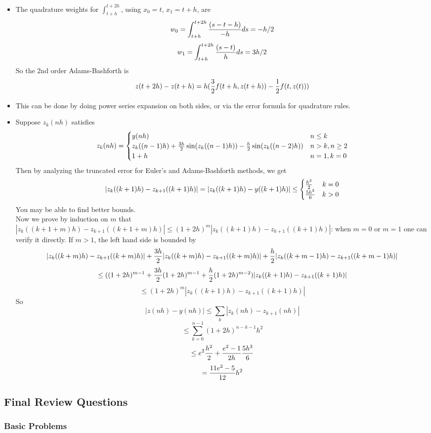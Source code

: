 \documentclass{article} %
\theoremstyle{break}
\begin{document}
\begin{itemize}
\item The quadrature weights for $\int_{t+h}^{t+2h}$, using $x_0=t$, $x_1=t+h$, are
  \[w_0=\int_{t+h}^{t+2h}{(s-t-h)\over -h}ds=-h/2\]
  \[w_1=\int_{t+h}^{t+2h}{(s-t)\over h}ds=3h/2\]
  So the 2nd order Adams-Bashforth is
  \[z(t+2h)-z(t+h)=h({3\over 2}f(t+h, z(t+h))-{1\over 2}f(t, z(t)))\]
\item This can be done by doing power series expansion on both sides, or via the error formula for quadrature rules.
\item Suppose $z_k(nh)$ satisfies
  \[z_k(nh)=\begin{cases}y(nh) & n\leq k\\ z_k((n-1)h)+{3h\over 2}\sin(z_k((n-1)h))-{h\over 2}\sin(z_k((n-2)h)) & n>k, n\geq 2\\ 1+h & n=1, k=0 \end{cases}\]
  Then by analyzing the truncated error for Euler's and Adams-Bashforth methods, we get
  \[|z_k((k+1)h)-z_{k+1}((k+1)h)|=|z_k((k+1)h)-y((k+1)h)|\leq \begin{cases}{h^2\over 2} & k=0 \\ {5h^3\over 6} & k>0\end{cases}\]
  You may be able to find better bounds.\\

  Now we prove by induction on $m$ that $|z_k((k+1+m)h)-z_{k+1}((k+1+m)h)|\leq (1+2h)^m|z_k((k+1)h)-z_{k+1}((k+1)h)|$: when $m=0$ or $m=1$ one can verify it directly. If $m>1$, the left hand side is bounded by
  \[|z_k((k+m)h)-z_{k+1}((k+m)h)|+{3h\over 2}|z_k((k+m)h)-z_{k+1}((k+m)h)|+{h\over 2}|z_k((k+m-1)h)-z_{k+1}((k+m-1)h)|\]
  \[\leq ((1+2h)^{m-1}+{3h\over 2}(1+2h)^{m-1}+{h\over 2}(1+2h)^{m-2})|z_k((k+1)h)-z_{k+1}((k+1)h)|\]
  \[\leq (1+2h)^m|z_k((k+1)h)-z_{k+1}((k+1)h)|\]
  So
  \[|z(nh)-y(nh)|\leq \sum_k|z_k(nh)-z_{k+1}(nh)|\]
  \[\leq\sum_{k=0}^{n-1}(1+2h)^{n-k-1}h^2\]
  \[\leq e^2{h^2\over 2}+{e^2-1\over 2h}{5h^3\over 6}\]
  \[={11e^2-5\over 12}h^2\]
\end{itemize}

\subsection{Final Review Questions}

\subsubsection{Basic Problems}
\end{document}
